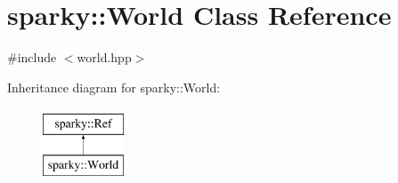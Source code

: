 \hypertarget{classsparky_1_1_world}{}\section{sparky\+:\+:World Class Reference}
\label{classsparky_1_1_world}


{\ttfamily \#include $<$world.\+hpp$>$}

Inheritance diagram for sparky\+:\+:World\+:\begin{figure}[H]
\begin{center}
\leavevmode
\includegraphics[height=2.000000cm]{classsparky_1_1_world}
\end{center}
\end{figure}
